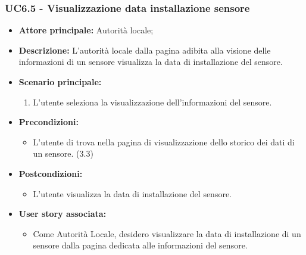 \subsubsection{UC6.5 - Visualizzazione data installazione sensore}
\begin{itemize}
    \item \textbf{Attore principale:} Autorità locale;
    \item \textbf{Descrizione:} L’autorità locale dalla pagina adibita alla visione delle informazioni di un sensore visualizza la data di installazione del sensore.
    \item \textbf{Scenario principale:}
    \begin{enumerate}
        \item L'utente seleziona la visualizzazione dell'informazioni del sensore.
    \end{enumerate}
\item \textbf{Precondizioni:}
    \begin{itemize}
        \item  L'utente di trova nella pagina di visualizzazione dello storico dei dati di un sensore. (3.3)
    \end{itemize}
    \item \textbf{Postcondizioni:}
          \begin{itemize}
              \item  L'utente visualizza la data di installazione del sensore.
          \end{itemize}
    \item \textbf{User story associata:}
          \begin{itemize}
              \item Come Autorità Locale, desidero visualizzare la data di installazione di un sensore dalla pagina dedicata alle informazioni del sensore.
          \end{itemize}
\end{itemize}
